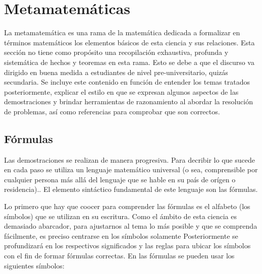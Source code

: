



\section{Metamatemáticas}

La metamatemática es una rama de la matemática dedicada a formalizar en términos matemáticos los elementos básicos de esta ciencia y sus relaciones. Esta sección no tiene como propósito una recopilación exhaustiva, profunda y sistemática  de hechos y teoremas en esta rama. Esto se debe a que el discurso va dirigido en buena medida a estudiantes de nivel pre-universitario, quizás secundaria. Se incluye este contenido en función de entender los temas tratados posteriormente, explicar el estilo en que se expresan algunos aspectos de las demostraciones y brindar herramientas de razonamiento al abordar la resolución de problemas, así como referencias para comprobar que son correctos.

\subsection{Fórmulas}

Las demostraciones se realizan de manera progresiva. Para decribir lo que sucede en cada paso se utiliza un lenguaje matemático universal (o sea, comprensible por cualquier persona más allá del lenguaje que se hable en su país de orígen o residencia).. El elemento sintáctico fundamental de este lenguaje son las fórmulas.

Lo primero que hay que coocer para comprender las fórmulas es el alfabeto (los símbolos) que se utilizan en su escritura. Como el ámbito de esta ciencia es demasiado abarcador, para ajustarnos al tema lo más posible y que se comprenda fácilmente, es preciso centrarse en los símbolos solamente  Posteriormente se profundizará en los respectivos significados y las reglas para ubicar los símbolos con el fin de formar fórmulas correctas. En las fórmulas se pueden usar los siguientes símbolos:

